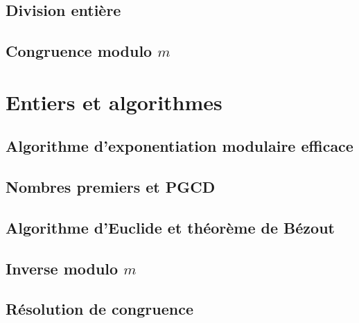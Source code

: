 \documentclass[
  letterpaper,
]{scrbook}
\theoremstyle{definition}
\theoremstyle{definition}
\theoremstyle{plain}
\theoremstyle{remark}
\begin{document}
\hypertarget{division-entiuxe8re-1}{%
\subsection{Division entière}\label{division-entiuxe8re-1}}

\hypertarget{congruence-modulo-m}{%
\subsection{\texorpdfstring{Congruence modulo
\(m\)}{Congruence modulo m}}\label{congruence-modulo-m}}

\hypertarget{entiers-et-algorithmes}{%
\section{Entiers et algorithmes}\label{entiers-et-algorithmes}}

\hypertarget{algorithme-dexponentiation-modulaire-efficace}{%
\subsection{Algorithme d'exponentiation modulaire
efficace}\label{algorithme-dexponentiation-modulaire-efficace}}

\hypertarget{nombres-premiers-et-pgcd}{%
\subsection{Nombres premiers et PGCD}\label{nombres-premiers-et-pgcd}}

\hypertarget{algorithme-deuclide-et-thuxe9oruxe8me-de-buxe9zout}{%
\subsection{Algorithme d'Euclide et théorème de
Bézout}\label{algorithme-deuclide-et-thuxe9oruxe8me-de-buxe9zout}}

\hypertarget{inverse-modulo-m}{%
\subsection{\texorpdfstring{Inverse modulo
\(m\)}{Inverse modulo m}}\label{inverse-modulo-m}}

\hypertarget{ruxe9solution-de-congruence}{%
\subsection{Résolution de
congruence}\label{ruxe9solution-de-congruence}}
\end{document}
